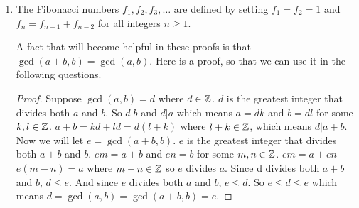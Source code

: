 \documentclass{article}
\begin{document}
\begin{enumerate}
\item The Fibonacci numbers $f_1, f_2, f_3, \ldots$ are defined by 
setting $f_1 = f_2 = 1$ and $f_n = f_{n-1} +f_{n-2}$
for all integers $n\geq 1$.
\par A fact that will become helpful in these proofs is that $\gcd(a+b,b) = \gcd(a,b)$.
\nl Here is a proof, so that we can use it in the following questions.
\begin{proof}
    Suppose $\gcd(a,b)=d$ where $d\in\mathbb{Z}$. $d$ is the greatest 
    integer that divides both $a$ and $b$.
    \nl So $d|b$ and $d|a$ which means $a=dk$ and $b=dl$ for some $k,l\in\mathbb{Z}$. \nl
    $a+b =kd+ld = d(l+k)$ where $l+k\in\mathbb{Z}$, which means $d |a+b$. \nl 
    \nl Now we will let $e=\gcd(a+b,b)$. $e$ is the greatest integer that divides
    both $a+b$ and $b$.
    \nl$em=a+b$ and $en=b$ for some $m,n\in\mathbb{Z}$.
    \nl$em=a+en$
    \nl$e(m-n)=a$ where $m-n\in\mathbb{Z}$ so $e$ divides $a$.
    \nl Since d divides both $a+b$ and $b$, $d\leq e$.
    \nl And since $e$ divides both $a$ and $b$, $e\leq d$.
    \nl So $e\leq d\leq e$ which means $d=\gcd(a,b)=\gcd(a+b,b)=e$.

\end{proof}
\end{enumerate}
\end{document}
